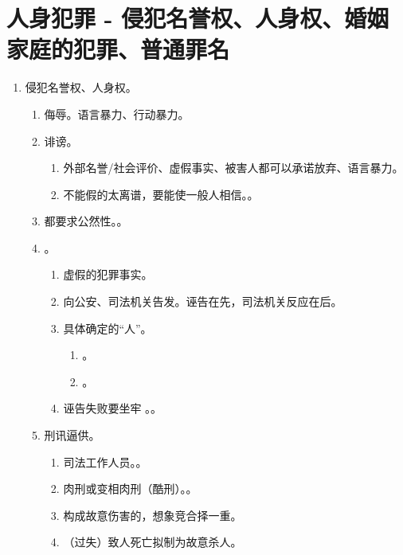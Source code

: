 \section{人身犯罪 - 侵犯名誉权、人身权、婚姻家庭的犯罪、普通罪名}
\begin{enumerate}
  \item 侵犯名誉权、人身权。
        \begin{enumerate}
          \item 侮辱。语言暴力、行动暴力。
          \item 诽谤。
                \begin{enumerate}
                  \item 外部名誉/社会评价、虚假事实、被害人都可以承诺放弃、语言暴力。
                  \item 不能假的太离谱，要能使一般人相信。。
                \end{enumerate}
          \item \sjt 都要求公然性。。
          \item {}。
                \begin{enumerate}
                  \item 虚假的犯罪事实。
                  \item \yi 向公安、司法机关告发。\er 诬告在先，司法机关反应在后。
                  \item 具体确定的“人”。
                        \begin{enumerate}
                          \item {}。
                          \item {}。
                        \end{enumerate}
                  \item 诬告失败要坐牢 \yjt {}。。
                \end{enumerate}
          \item 刑讯逼供。
                \begin{enumerate}
                  \item 司法工作人员。。
                  \item 肉刑或变相肉刑（酷刑）。。
                  \item 构成故意伤害的，想象竞合择一重。
                  \item （过失）致人死亡拟制为故意杀人。

\end{enumerate}
\end{enumerate}
\end{enumerate}
